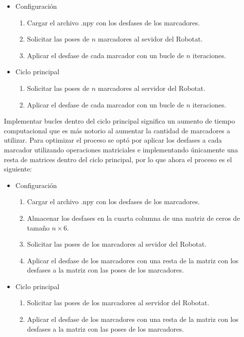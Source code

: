 \begin{itemize}
	\item Configuración
	\begin{enumerate}
		\item Cargar el archivo .npy con los desfases de los marcadores.
		\item Solicitar las poses de $n$ marcadores al sevidor del Robotat.
		\item Aplicar el desfase de cada marcador con un bucle de $n$ iteraciones.
	\end{enumerate}
	\item Ciclo principal 
	\begin{enumerate}
		\item Solicitar las poses de $n$ marcadores al servidor del Robotat.
		\item Aplicar el desfase de cada marcador con un bucle de $n$ iteraciones.
	\end{enumerate}
\end{itemize}

Implementar bucles dentro del ciclo principal significa un aumento de tiempo computacional que es más notorio al aumentar la cantidad de marcadores a utilizar. Para optimizar el proceso se optó por aplicar los desfases a cada marcador utilizando operaciones matriciales e implementando únicamente una resta de matrices dentro del ciclo principal, por lo que ahora el proceso es el siguiente:

\begin{itemize}
	\item Configuración
	\begin{enumerate}
		\item Cargar el archivo .npy con los desfases de los marcadores.
		\item Almacenar los desfases en la cuarta columna de una matriz de ceros de tamaño $n \times 6$.
		\item Solicitar las poses de los marcadores al sevidor del Robotat.
		\item Aplicar el desfase de los marcadores con una resta de la matriz con los desfases a la matriz con las poses de los marcadores.
	\end{enumerate}
	\item Ciclo principal 
	\begin{enumerate}
		\item Solicitar las poses de los marcadores al servidor del Robotat.
		\item Aplicar el desfase de los marcadores con una resta de la matriz con los desfases a la matriz con las poses de los marcadores.
	\end{enumerate}
\end{itemize}

